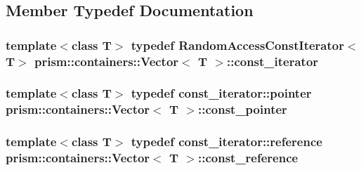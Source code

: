 \subsection{Member Typedef Documentation}
\subsubsection[{\texorpdfstring{const\+\_\+iterator}{const_iterator}}]{\setlength{\rightskip}{0pt plus 5cm}template$<$class T$>$ typedef Random\+Access\+Const\+Iterator$<$T$>$ {\bf prism\+::containers\+::\+Vector}$<$ T $>$\+::{\bf const\+\_\+iterator}}\hypertarget{classprism_1_1containers_1_1_vector_ab972cb3df6df07d9806f8750a948ec9d}{}\label{classprism_1_1containers_1_1_vector_ab972cb3df6df07d9806f8750a948ec9d}
\subsubsection[{\texorpdfstring{const\+\_\+pointer}{const_pointer}}]{\setlength{\rightskip}{0pt plus 5cm}template$<$class T$>$ typedef const\+\_\+iterator\+::pointer {\bf prism\+::containers\+::\+Vector}$<$ T $>$\+::{\bf const\+\_\+pointer}}\hypertarget{classprism_1_1containers_1_1_vector_a1a5e05e74505807405e07550f8c1c5ad}{}\label{classprism_1_1containers_1_1_vector_a1a5e05e74505807405e07550f8c1c5ad}
\subsubsection[{\texorpdfstring{const\+\_\+reference}{const_reference}}]{\setlength{\rightskip}{0pt plus 5cm}template$<$class T$>$ typedef const\+\_\+iterator\+::reference {\bf prism\+::containers\+::\+Vector}$<$ T $>$\+::{\bf const\+\_\+reference}}\hypertarget{classprism_1_1containers_1_1_vector_a9950012c32498b47e38c98f2ce9fe048}{}\label{classprism_1_1containers_1_1_vector_a9950012c32498b47e38c98f2ce9fe048}
